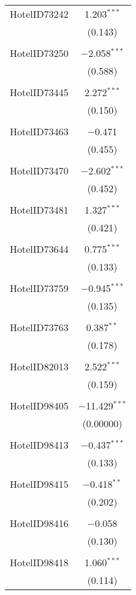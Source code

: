 \documentclass{article}
\begin{document}
\begin{table}[!htbp]
\begin{tabular}{@{\extracolsep{5pt}}lc}
		HotelID73242 & 1.203$^{***}$ \\ 
		& (0.143) \\ 
		& \\ 
		HotelID73250 & $-$2.058$^{***}$ \\ 
		& (0.588) \\ 
		& \\ 
		HotelID73445 & 2.272$^{***}$ \\ 
		& (0.150) \\ 
		& \\ 
		HotelID73463 & $-$0.471 \\ 
		& (0.455) \\ 
		& \\ 
		HotelID73470 & $-$2.602$^{***}$ \\ 
		& (0.452) \\ 
		& \\ 
		HotelID73481 & 1.327$^{***}$ \\ 
		& (0.421) \\ 
		& \\ 
		HotelID73644 & 0.775$^{***}$ \\ 
		& (0.133) \\ 
		& \\ 
		HotelID73759 & $-$0.945$^{***}$ \\ 
		& (0.135) \\ 
		& \\ 
		HotelID73763 & 0.387$^{**}$ \\ 
		& (0.178) \\ 
		& \\ 
		HotelID82013 & 2.522$^{***}$ \\ 
		& (0.159) \\ 
		& \\ 
		HotelID98405 & $-$11.429$^{***}$ \\ 
		& (0.00000) \\ 
		& \\ 
		HotelID98413 & $-$0.437$^{***}$ \\ 
		& (0.133) \\ 
		& \\ 
		HotelID98415 & $-$0.418$^{**}$ \\ 
		& (0.202) \\ 
		& \\ 
		HotelID98416 & $-$0.058 \\ 
		& (0.130) \\ 
		& \\ 
		HotelID98418 & 1.060$^{***}$ \\ 
		& (0.114) \\ 

\end{tabular}
\end{table}
\end{document}
